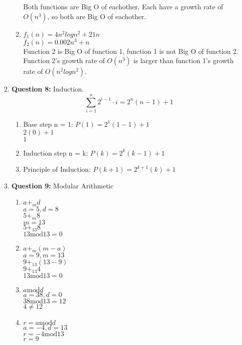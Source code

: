 \documentclass[11pt]{article}
\begin{document}
\begin{enumerate}
\begin{enumerate}[label=(\alph*)]
    Both functions are Big O of eachother. Each have a growth rate of $O(n^3)$, so both are Big O of eachother.
    \item 
    $f_1(n) = 4n^2logn^2+21n$ \\
    $f_2(n) = 0.002n^3 + n$ \\
    Function 2 is Big O of function 1, function 1 is not Big O of function 2. Function 2's growth rate of $O(n^3)$ is larger than function 1's growth rate of $O(n^2logn^2)$.
\end{enumerate}
\item
\textbf{Question 8:} Induction.
\begin{equation*}
    \sum_{i = 1}^{n}2^{i-1}\cdot i=2^n(n-1)+1 
\end{equation*}
\begin{enumerate}[label=(\alph*)]
    \item
    Base step n = 1: $P(1) = 2^1(1-1)+1$ \\
    $2(0)+1$ \\
    $1$
    \item 
    Induction step n = k: $P(k) = 2^k(k-1)+1$
    \item 
    Principle of Induction: $P(k+1) = 2^{k+1}(k)+1$
\end{enumerate}
\item
\textbf{Question 9:} Modular Arithmetic
\begin{enumerate}[label=(\alph*)]
    \item
    $a+_m d$\\
    $a = 5, d = 8$ \\
    $5+_m 8$ \\
    $m = 13$ \\
    $5+_{13} 8$ \\
    $13\text{mod}13 = 0$
    \item
    $a +_m (m - a)$ \\
    $a = 9, m = 13$ \\ 
    $9+_{13} (13-9)$ \\
    $9+_{13} 4$ \\
    $13\text{mod}13 = 0$
    \item
    $a \text{mod} d$ \\
    $a = 38, d = 0$ \\
    $38\text{mod}13 =12$ \\
    $4 \neq  12$
    \item 
    $r = a\text{mod}d$ \\
    $a = -4, d = 13$ \\
    $r = -4\text{mod}13$ \\
    $r = 9$


\end{enumerate}
\end{enumerate}
\end{document}
